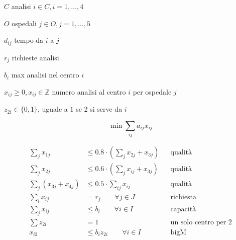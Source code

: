 \Par

$C$ analisi $i\in C,i=1,\dotsc ,4$

$O$ ospedali $j\in O,j=1,\dotsc ,5$

$d_{ij}$ tempo da $i$ a $j$

$r_{j}$ richieste analisi

$b_{i}$ max analisi nel centro $i$

\Var

$x_{ij} \geq 0,x_{ij} \in \mathbb{Z}$ numero analisi al centro $i$ per ospedale $j$

$z_{2i} \in \{0,1\}$, uguale a $1$ se 2 si serve da $i$

\Fob

\begin{equation*}
	\min\sum _{ij} a_{ij} x_{ij}
\end{equation*}

\Vin

\begin{align*}
	\sum _{j} x_{1j} &\leq 0.8\cdot \left(\sum _{j} x_{2j} +x_{3j}\right) && \text{qualità} \\
	\sum _{j} x_{2j} &\leq 0.6\cdot \left(\sum _{j} x_{ij} +x_{3j}\right) && \text{qualità} \\
	\sum _{j}( x_{3j} +x_{4j}) &\leq 0.5\cdot \sum _{ij} x_{ij} && \text{qualità} \\
	\sum _{i} x_{ij} &=r_{j} \qquad\forall j\in J && \text{richiesta} \\
	\sum _{j} x_{ij} &\leq b_{i} \qquad\forall i\in I && \text{capacità} \\
	\sum z_{2i} &=1 && \text{un solo centro per 2} \\
	x_{i2} &\leq b_{i} z_{2i} \qquad\forall i\in I && \text{bigM} \\
\end{align*}